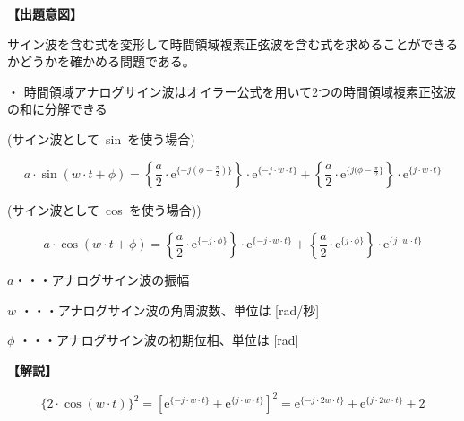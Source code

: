 \noindent \textbf{【出題意図】}

\bigskip
\noindent サイン波を含む式を変形して時間領域複素正弦波を含む式を求めることができるかどうかを確かめる問題である。

\medskip
\noindent ・ 時間領域アナログサイン波はオイラー公式を用いて2つの時間領域複素正弦波の和に分解できる

\medskip
\noindent \mbox{(サイン波として sin を使う場合)}

\[
a \cdot \sin ( w \cdot t + \phi )
=  \left \{ \frac{a}{2} \cdot \textrm{e}^{\{-j (\phi-\frac{\pi}{2}) \}} \right \} \cdot \textrm{e}^{\{-j \cdot w \cdot t \}}
+  \left \{ \frac{a}{2} \cdot \textrm{e}^{\{j (\phi-\frac{\pi}{2} \}} \right \} \cdot \textrm{e}^{\{j \cdot w \cdot t \}}
\]

\medskip
\noindent \mbox{(サイン波として cos を使う場合))}

\[
a \cdot \cos ( w \cdot t + \phi )
=  \left \{ \frac{a}{2} \cdot \textrm{e}^{\{-j \cdot \phi \}} \right \} \cdot \textrm{e}^{\{-j \cdot w \cdot t \}}
+  \left \{ \frac{a}{2} \cdot \textrm{e}^{\{j  \cdot \phi \}} \right \} \cdot \textrm{e}^{\{j \cdot w \cdot t \}}
\]

\bigskip
\noindent  $a$・・・アナログサイン波の振幅

\bigskip
\noindent $w$ ・・・アナログサイン波の角周波数、単位は [rad/秒]

\bigskip
\noindent $\phi$ ・・・アナログサイン波の初期位相、単位は [rad]

\bigskip

\vspace{1em}
\noindent \textbf{【解説】}

\bigskip

\[
\{2 \cdot \cos (w \cdot t) \}^2 = 
\left [ \textrm{e}^{\{-j \cdot w \cdot t \}} 
+ \textrm{e}^{\{j \cdot w \cdot t \}} 
\right ]^2
=
\textrm{e}^{\{-j \cdot 2w \cdot t \}}
+\textrm{e}^{\{ j \cdot 2w \cdot t \}}
+2
\]
